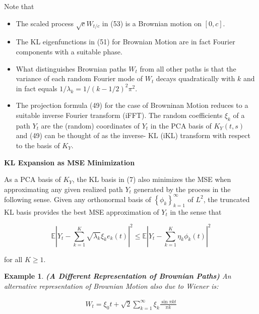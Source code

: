 \documentclass[11pt]{article}
\theoremstyle{plain} %
\newtheorem{example}[theorem]{Example}
\theoremstyle{remark}
\begin{document}
Note that

\begin{itemize}
  \item The scaled process $\sqrt{c} W_{t / c}$ in (53) is a Brownian motion on
        $[0, c]$.

  \item The KL eigenfunctions in (51) for Brownian Motion are in fact Fourier
        components with a suitable phase.

  \item What distinguishes Brownian paths $W_{t}$ from all other paths is that
        the variance of each random Fourier mode of $W_{t}$ decays quadratically with
        $k$ and in fact equals $1 / \lambda_{k}=1 /(k-1 / 2)^{2} \pi^{2}$.

  \item The projection formula (49) for the case of Browninan Motion reduces to
        a suitable inverse Fourier transform (iFFT). The random coefficients $\xi_{k}$
        of a path $Y_{t}$ are the (random) coordinates of $Y_{t}$ in the PCA basis of
        $K_{Y}(t, s)$ and (49) can be thought of as the inverse- $\mathrm{KL}$ (iKL)
        transform with respect to the basis of $K_{Y}$.

\end{itemize}

\textbf{KL Expansion as MSE Minimization}

As a PCA basis of $K_{Y}$, the KL basis in (7) also minimizes the MSE when
approximating any given realized path $Y_{t}$ generated by the process in the
following sense. Given any orthonormal basis of
$\left\{\phi_{k}\right\}_{k=1}^{\infty}$ of $L^{2}$, the truncated KL basis
provides the best MSE approximation of $Y_{t}$ in the sense that

$$
  \mathbb{E}\left|Y_{t}-\sum_{k=1}^{K} \sqrt{\lambda_{k}} \xi_{k} e_{k}(t)\right|^{2} \leq \mathbb{E}\left|Y_{t}-\sum_{k=1}^{K} \eta_{k} \phi_{k}(t)\right|^{2}
$$

for all $K \geq 1$.

\begin{example}\textbf{(A Different Representation of Brownian Paths)}
  An alternative representation of Brownian Motion also due to Wiener is:

\begin{align}
  W_{t}=\xi_{0} t+\sqrt{2} \sum_{k=1}^{\infty} \xi_{k} \frac{\sin \pi k t}{\pi k}
  \label{eq:A Different Representation of Brownian Paths}
\end{align}
\end{example}
\end{document}
